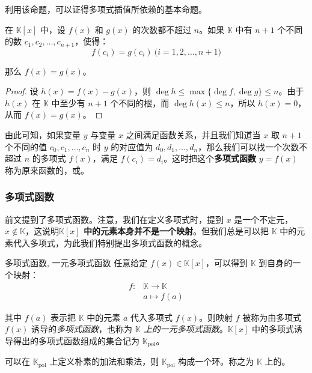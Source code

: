利用该命题，可以证得多项式插值所依赖的基本命题。

\begin{proposition}
	在 $\mathbb K[x]$ 中，设 $f(x)$ 和 $g(x)$ 的次数都不超过 $n$。如果 $\mathbb K$ 中有 $n + 1$ 个不同的数 $c_1, c_2, \ldots, c_{n + 1}$，使得：
	$$
	f(c_i) = g(c_i) \pod{i = 1, 2, \ldots, n + 1}
	$$

	那么 $f(x) = g(x)$。
\end{proposition}

\begin{proof}
	设 $h(x) = f(x) - g(x)$，则 $\deg h \le \max\{ \deg f, \deg g \} \le n$。由于 $h(x)$ 在 $\mathbb K$ 中至少有 $n + 1$ 个不同的根，而 $\deg h(x) \le n$，所以 $h(x) = 0$，从而 $f(x) = g(x)$。
\end{proof}

由此可知，如果变量 $y$ 与变量 $x$ 之间满足函数关系，并且我们知道当 $x$ 取 $n + 1$ 个不同的值 $c_0, c_1, \ldots, c_n$ 时 $y$ 的对应值为 $d_0, d_1, \ldots, d_n$，那么我们可以找一个次数不超过 $n$ 的多项式 $f(x)$，满足 $f(c_i) = d_i$。这时把这个\textbf{多项式函数} $y = f(x)$ 称为原来函数的\emph{}，或\emph{}。

\subsubsection{多项式函数}

前文提到了多项式函数。注意，我们在定义多项式时，提到 $x$ 是一个不定元，$x \not \in \mathbb K$，这说明\textbf{$\mathbb K[x]$ 中的元素本身并不是一个映射}。但我们总是可以把 $\mathbb K$ 中的元素代入多项式，为此我们特别提出多项式函数的概念。

\begin{definition}{多项式函数, 一元多项式函数}
	任意给定 $f(x) \in \mathbb K[x]$，可以得到 $\mathbb K$ 到自身的一个映射：
	$$
	\begin{aligned}
		f \colon & \mathbb K \to \mathbb K
		\\&
		a \mapsto f(a)
	\end{aligned}
	$$

	其中 $f(a)$ 表示把 $\mathbb K$ 中的元素 $a$ 代入多项式 $f(x)$。则映射 $f$ 被称为由多项式 $f(x)$ 诱导的\emph{多项式函数}，也称为 \emph{$\mathbb K$ 上的一元多项式函数}。$\mathbb K[x]$ 中的多项式诱导得出的多项式函数组成的集合记为 $\mathbb K_\mathrm{pol}$。
\end{definition}

可以在 $\mathbb K_\mathrm{pol}$ 上定义朴素的加法和乘法，则 $\mathbb K_\mathrm{pol}$ 构成一个环。称之为 $\mathbb K$ 上的\emph{}。

